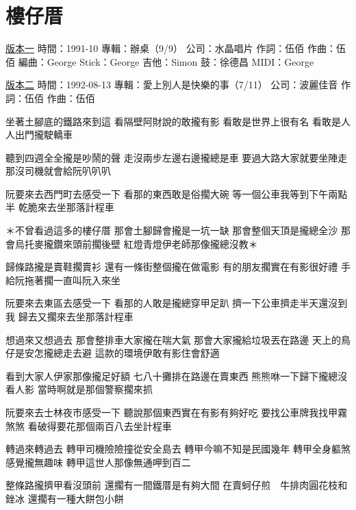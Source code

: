 \documentclass[UTF8,a4paper,oneside,twocolumn,12pt]{ctexbook}
\newcommand{\infopair}[2]{\textbullet #1：#2}
\newcommand{\zc}[1][伍佰]{\infopair{作詞}{#1}}
\newcommand{\zq}[1][伍佰]{\infopair{作曲}{#1}}
\newcommand{\bq}[1][伍佰]{\infopair{編曲}{#1}}
\newcommand{\zj}[1]{\infopair{專輯}{#1}}
\newcommand{\sj}[1]{\infopair{時間}{#1}}
\newcommand{\gs}[1]{\infopair{公司}{#1}}
\newenvironment{info}{\begin{flushleft}\kaishu
	}
	{\end{flushleft}\normalsize\yahei\par}
\newenvironment{lyric}{
	}
{}
\begin{document}
\section{樓仔厝}
\begin{info}
	\underline{版本一}
	\sj{1991-10}
	\zj{辦桌（9/9）}
	\gs{水晶唱片}
	\zc
	\zq
	\bq[George]
	\infopair{Stick}{George}
	\infopair{吉他}{Simon}
	\infopair{鼓}{徐德昌}
	\infopair{MIDI}{George}
\end{info}
\begin{info}
	\underline{版本二}
	\sj{1992-08-13}
	\zj{愛上別人是快樂的事（7/11）}
	\gs{波麗佳音}
	\zc
	\zq
\end{info}
\begin{lyric}
	坐著土腳底的鐵路來到這
	看隔壁阿財說的敢攏有影
	看敢是世界上很有名
	看敢是人人出門攏駛轎車

	聽到四週全全攏是吵鬧的聲
	走沒兩步左邊右邊攏總是車
	要過大路大家就要坐陣走
	那沒司機就會給阮叭叭叭

	阮要來去西門町去感受一下
	看那的東西敢是俗擱大碗
	等一個公車我等到下午兩點半
	乾脆來去坐那落計程車

	＊不曾看過這多的樓仔厝
	那會土腳歸會攏是一坑一缺
	那會整個天頂是攏總全沙
	那會烏托麥攏鑽來頭前擱後壁
	紅燈青燈伊老師那像攏總沒教＊

	歸條路攏是賣鞋擱賣衫
	還有一條街整個攏在做電影
	有的朋友擱實在有影很好禮
	手給阮拖著擱一直叫阮入來坐

	阮要來去東區去感受一下
	看那的人敢是攏總穿甲足趴
	擠一下公車擠走半天還沒到我
	歸去又擱來去坐那落計程車

	想過來又想過去
	那會整排車大家攏在喘大氣
	那會大家攏給垃圾丟在路邊
	天上的鳥仔是安怎攏總走去避
	這款的環境伊敢有影住會舒適

	看到大家人伊家那像攏足好額
	七八十攤排在路邊在賣東西
	熊熊咻一下歸下攏總沒看人影
	當時啊就是那個警察擱來抓

	阮要來去士林夜市感受一下
	聽說那個東西實在有影有夠好吃
	要找公車牌我找甲霧煞煞
	看破得要花那個兩百八去坐計程車

	轉過來轉過去
	轉甲司機險險撞從安全島去
	轉甲今嘛不知是民國幾年
	轉甲全身軀煞感覺攏無趣味
	轉甲這世人那像無通呷到百二

	整條路攏擠甲看沒頭前
	還擱有一間鐵厝是有夠大間
	在賣蚵仔煎　牛排肉圓花枝和銼冰
	還擱有一種大餅包小餅
\end{lyric}
\end{document}

